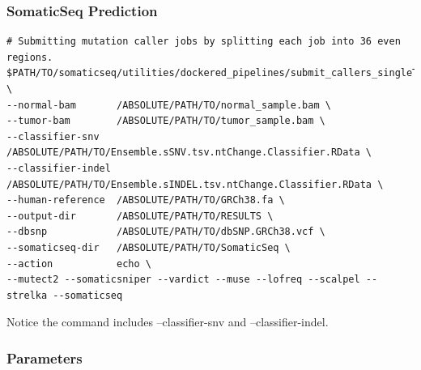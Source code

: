 \documentclass[10pt,letterpaper]{article}
\begin{document}
\begin{sloppypar}
\subsubsection{SomaticSeq Prediction}

\begin{lstlisting}
# Submitting mutation caller jobs by splitting each job into 36 even regions.
$PATH/TO/somaticseq/utilities/dockered_pipelines/submit_callers_singleThread.sh \
--normal-bam       /ABSOLUTE/PATH/TO/normal_sample.bam \
--tumor-bam        /ABSOLUTE/PATH/TO/tumor_sample.bam \
--classifier-snv   /ABSOLUTE/PATH/TO/Ensemble.sSNV.tsv.ntChange.Classifier.RData \
--classifier-indel /ABSOLUTE/PATH/TO/Ensemble.sINDEL.tsv.ntChange.Classifier.RData \
--human-reference  /ABSOLUTE/PATH/TO/GRCh38.fa \
--output-dir       /ABSOLUTE/PATH/TO/RESULTS \
--dbsnp            /ABSOLUTE/PATH/TO/dbSNP.GRCh38.vcf \
--somaticseq-dir   /ABSOLUTE/PATH/TO/SomaticSeq \
--action           echo \
--mutect2 --somaticsniper --vardict --muse --lofreq --scalpel --strelka --somaticseq
\end{lstlisting}

Notice the command includes --classifier-snv and --classifier-indel.







\subsubsection{Parameters}


\end{sloppypar}
\end{document}
